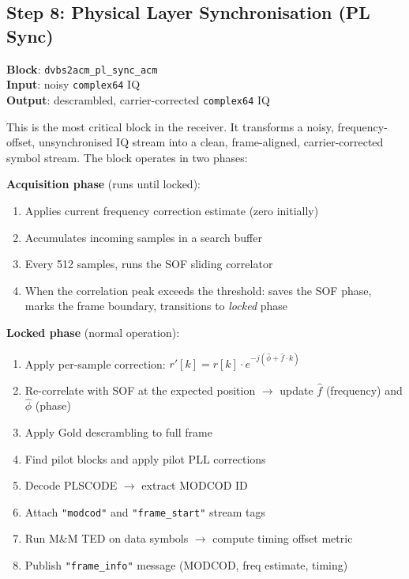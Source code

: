 \documentclass[12pt,a4paper]{report}
\begin{document}
\subsection{Step 8: Physical Layer Synchronisation (PL Sync)}

\textbf{Block}: \texttt{dvbs2acm\_pl\_sync\_acm} \\
\textbf{Input}: noisy \texttt{complex64} IQ \\
\textbf{Output}: descrambled, carrier-corrected \texttt{complex64} IQ

This is the most critical block in the receiver. It transforms a noisy,
frequency-offset, unsynchronised IQ stream into a clean, frame-aligned,
carrier-corrected symbol stream. The block operates in two phases:

\textbf{Acquisition phase} (runs until locked):
\begin{enumerate}
    \item Applies current frequency correction estimate (zero initially)
    \item Accumulates incoming samples in a search buffer
    \item Every 512 samples, runs the SOF sliding correlator
    \item When the correlation peak exceeds the threshold: saves the SOF phase,
          marks the frame boundary, transitions to \emph{locked} phase
\end{enumerate}

\textbf{Locked phase} (normal operation):
\begin{enumerate}
    \item Apply per-sample correction: $r'[k] = r[k] \cdot e^{-j(\hat{\phi}+\hat{f}\cdot k)}$
    \item Re-correlate with SOF at the expected position $\to$ update
          $\hat{f}$ (frequency) and $\hat{\phi}$ (phase)
    \item Apply Gold descrambling to full frame
    \item Find pilot blocks and apply pilot PLL corrections
    \item Decode PLSCODE $\to$ extract MODCOD ID
    \item Attach \texttt{"modcod"} and \texttt{"frame\_start"} stream tags
    \item Run M\&M TED on data symbols $\to$ compute timing offset metric
    \item Publish \texttt{"frame\_info"} message (MODCOD, freq estimate, timing)
\end{enumerate}
\end{document}
